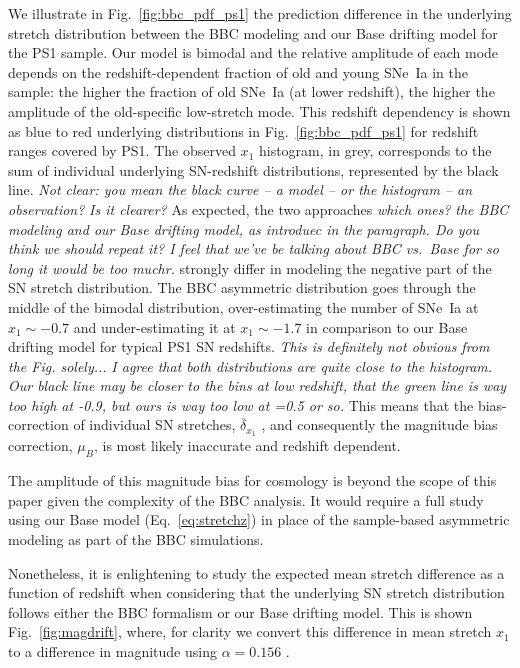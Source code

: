 \documentclass[]{aa} %
\newcommand{\nn}[1]{{\textcolor[rgb]{0.25, 0.50, 0}{#1}}}
\newcommand{\yc}[1]{{\textcolor{BrickRed}{#1}}}
\begin{document}
We illustrate in Fig.~\ref{fig:bbc_pdf_ps1} the prediction difference in the
underlying stretch distribution between the BBC modeling and our Base drifting
model for the PS1 sample. Our model is bimodal and the relative amplitude of
each mode depends on the redshift-dependent fraction of old and young SNe~Ia in
the sample: the higher the fraction of old SNe~Ia (at lower redshift), the
higher the amplitude of the old-specific low-stretch mode. This redshift
dependency is shown as blue to red underlying distributions in
Fig.~\ref{fig:bbc_pdf_ps1} for redshift ranges covered by PS1. The observed
$x_1$ histogram\nn{, in grey,} corresponds to the sum of individual underlying
SN-redshift distributions\nn{, represented by the black line.} \yc{\textit{Not
clear: you mean the black curve -- a model -- or the histogram -- an
observation?}} \nn{\textit{Is it clearer?}} As expected, the two approaches
\yc{\textit{which ones?}} \nn{\textit{the BBC modeling and our Base
drifting model, as introduec in the paragraph. Do you think we should repeat it?
I feel that we've be talking about BBC vs.\ Base for so long it would be too
muchr.}} strongly differ in modeling the negative part of the SN stretch
distribution. The BBC asymmetric distribution goes through the middle of the
bimodal distribution, over-estimating the number of SNe~Ia at $x_1\sim-0.7$ and
under-estimating it at $x_1\sim-1.7$ in comparison to our Base drifting model
for typical PS1 SN redshifts. \yc{\textit{This is definitely not obvious from the Fig.
solely...}} \nn{\textit{I agree that both distributions are quite close to the
histogram. Our black line may be closer to the bins at low redshift, that the
green line is way too high at -0.9, but ours is way too low at =0.5 or so.}}
This means that the bias-correction of individual SN stretches,
$\overline{\delta}_{x_1}$ \citep{kessler2017}, and consequently the
magnitude bias correction, $\mu_B$, is most likely inaccurate and redshift
dependent. 

The amplitude of this magnitude bias for cosmology is beyond the scope of
this paper given the complexity of the BBC analysis. It would require a full
study using our Base model (Eq.~\ref{eq:stretchz}) in place of the sample-based
asymmetric modeling as part of the BBC simulations.

Nonetheless, it is enlightening to study the expected mean stretch difference as
a function of redshift when considering that the underlying SN stretch
distribution follows either the BBC formalism or our Base drifting model. This
is shown Fig.~\ref{fig:magdrift}, where, for clarity we convert this difference
in mean stretch $x_1$ to a difference in magnitude using $\alpha=0.156$
\citep{scolnic2018a}.
\end{document}
